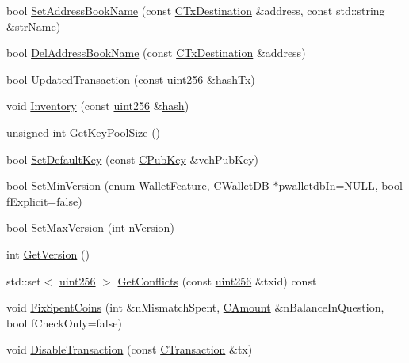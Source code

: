 \begin{DoxyCompactItemize}
bool \hyperlink{class_c_wallet_a95d2dd3693db562aa11afbecf33e1276}{Set\+Address\+Book\+Name} (const \hyperlink{keystore_8h_a8f46ecba0ddeb036be6b58d6ed1909cd}{C\+Tx\+Destination} \&address, const std\+::string \&str\+Name)
\item 
bool \hyperlink{class_c_wallet_ac21ad6cf1271b08f0392259643ef5804}{Del\+Address\+Book\+Name} (const \hyperlink{keystore_8h_a8f46ecba0ddeb036be6b58d6ed1909cd}{C\+Tx\+Destination} \&address)
\item 
bool \hyperlink{class_c_wallet_a96a5b2321f27270c5959bc697cca9c9a}{Updated\+Transaction} (const \hyperlink{classuint256}{uint256} \&hash\+Tx)
\item 
void \hyperlink{class_c_wallet_a1d8866fc8756a846058ea16c730b02e1}{Inventory} (const \hyperlink{classuint256}{uint256} \&\hyperlink{cache_8cc_a11ecb029164e055f28f4123ce3748862}{hash})
\item 
unsigned int \hyperlink{class_c_wallet_a9d7415d88d10655ff2188bc713dff662}{Get\+Key\+Pool\+Size} ()
\item 
bool \hyperlink{class_c_wallet_ad54cca8f6e5e1d5535860f43ddb0246f}{Set\+Default\+Key} (const \hyperlink{class_c_pub_key}{C\+Pub\+Key} \&vch\+Pub\+Key)
\item 
bool \hyperlink{class_c_wallet_afa48a3ee3096681650c8b9589579e9cb}{Set\+Min\+Version} (enum \hyperlink{wallet_8h_a39a6b71da3eb95cddc0836d3b27ac7c9}{Wallet\+Feature}, \hyperlink{class_c_wallet_d_b}{C\+Wallet\+D\+B} $\ast$pwalletdb\+In=N\+U\+L\+L, bool f\+Explicit=false)
\item 
bool \hyperlink{class_c_wallet_a1bb7c19e7dd483f231f8077fb7fb942b}{Set\+Max\+Version} (int n\+Version)
\item 
int \hyperlink{class_c_wallet_a3e37adcf1b2ad9fc02ae3e8da7c692c9}{Get\+Version} ()
\item 
std\+::set$<$ \hyperlink{classuint256}{uint256} $>$ \hyperlink{class_c_wallet_ad336f9b3359fd9ded9007bc6803340fa}{Get\+Conflicts} (const \hyperlink{classuint256}{uint256} \&txid) const 
\item 
void \hyperlink{class_c_wallet_aa1e6f8f54b36ae7ec11f567a59a99aa3}{Fix\+Spent\+Coins} (int \&n\+Mismatch\+Spent, \hyperlink{amount_8h_a4eaf3a5239714d8c45b851527f7cb564}{C\+Amount} \&n\+Balance\+In\+Question, bool f\+Check\+Only=false)
\item 
void \hyperlink{class_c_wallet_a1782cbf0771e3c5dc440cbfd421a97b2}{Disable\+Transaction} (const \hyperlink{class_c_transaction}{C\+Transaction} \&tx)
\end{DoxyCompactItemize}

